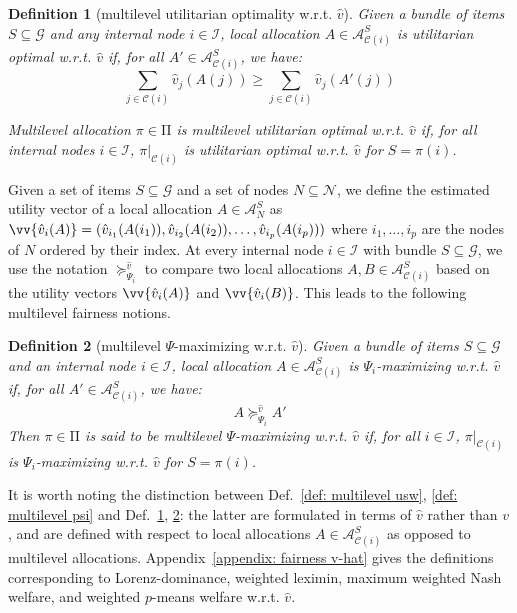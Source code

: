 \documentclass[]{article}
\newtheorem{definition}{Definition}
\newcommand{\nodes}{\mathcal{N}}
\newcommand{\items}{\mathcal{G}}
\newcommand{\children}{\mathcal{C}}
\newcommand{\internal}{\mathcal{I}}
\newcommand{\mallocations}{\mathrm{\Pi}}
\newcommand{\allocations}{\mathcal{A}}
\begin{document}
\begin{definition}[multilevel utilitarian optimality w.r.t. $\hat{v}$] \label{def: multilevel usw v hat} Given a bundle of items $S \subseteq \items$ and any internal node $i\in\internal$, local allocation $A \in \allocations^S_{\children(i)}$ is \emph{utilitarian optimal w.r.t. $\hat{v}$} if, for all $A' \in \allocations^S_{\children(i)}$, we have:
$$
\sum_{j \in \children(i)} \hat{v}_j(A(j)) \geq \sum_{j \in \children(i)} \hat{v}_j(A'(j))
$$

\noindent Multilevel allocation $\pi \in \mallocations$ is \emph{multilevel utilitarian optimal w.r.t. $\hat{v}$} if, for all internal nodes $i \in \internal$, 
$\pi \vert_{\children(i)}$ is utilitarian optimal w.r.t. $\hat{v}$ for $S = \pi(i)$.
\end{definition}

Given a set of items $S \subseteq \items$ and a set of nodes $N \subseteq \nodes$, we define the estimated utility vector of a local allocation $A \in \allocations^S_N$ as $\vv{\hat{v}_i(A)} = (\hat{v}_{i_1}(A(i_1)), \hat{v}_{i_2}(A(i_2)), \ldots, \hat{v}_{i_p}(A(i_p)))$ where $i_1, \ldots, i_p$ are the nodes of $N$ ordered by their index. At every internal node $i \in \internal$ with bundle $S \subseteq \items$, we use the notation $\succeq_{\Psi_i}^{\hat{v}}$ to compare two local allocations $A, B \in \allocations^S_{\children(i)}$ based on the utility vectors $\vv{\hat{v}_i(A)}$ and $\vv{\hat{v}_i(B)}$. This leads to the following multilevel fairness notions.

\begin{definition}[multilevel $\Psi$-maximizing w.r.t. $\hat{v}$] \label{def: multilevel psi v hat} Given a bundle of items $S \subseteq \items$ and an internal node $i \in \internal$, local allocation $A \in \allocations^S_{\children(i)}$ is \emph{$\Psi_i$-maximizing w.r.t. $\hat{v}$} if, for all $A' \in \allocations^S_{\children(i)}$, we have:
$$
A \succeq_{\Psi_i}^{\hat{v}} A'
$$
Then $\pi \in \mallocations$ is said to be {\em multilevel  $\Psi$-maximizing w.r.t. $\hat{v}$} if, for all $i \in \internal$, $\pi \vert_{\children(i)}$ is $\Psi_i$-maximizing w.r.t. $\hat{v}$  for $S = \pi(i)$. 
\end{definition}

It is worth noting the distinction between Def.~\ref{def: multilevel usw}, \ref{def: multilevel psi} and Def.~\ref{def: multilevel usw v hat}, \ref{def: multilevel psi v hat}: the latter are formulated in terms of $\hat{v}$ rather than $v$, and are defined with respect to local allocations $A \in \allocations^S_{\children(i)}$ as opposed to multilevel allocations. Appendix~\ref{appendix: fairness v-hat} gives the definitions corresponding to Lorenz-dominance, weighted leximin, maximum weighted Nash welfare, and weighted $p$-means welfare w.r.t. $\hat{v}$. 
\end{document}
